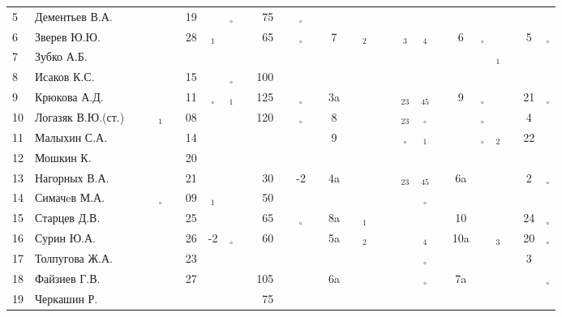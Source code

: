 \documentclass[a4paper,landscape,11pt]{article}
\newcommand*\OK{&\small \ding{51}$\!\!_\circ$} %
\newcommand*\Ok{&\small \ding{51}$\!\!_\circ$} %
\newcommand*\ok{&{\small\ding{51}}} %
\newcommand*\no{&{\small }} %
\newcommand*\da{&{\small\ding{48}$\!\!_1$}} %
\newcommand*\db{&{\small\ding{48}$\!\!_2$}} %
\newcommand*\bc{&{\small\ding{48}$\!\!_{23}$}} %
\newcommand*\dc{&{\small\ding{48}$\!\!_3$}} %
\newcommand*\dd{&{\small\ding{48}$\!\!_4$}} %
\newcommand*\De{&{\small\ding{48}$\!\!_{45}$}} %
\begin{document}
\begin{tabular}{l|l|ccccccccrccccccccccccccccc}
 5& Дементьев В.А.   \ok\ok\ok\ok&19\no\OK\ok& 75\no\Ok\ok \no\ok\no\no\ok\ok\no\no \no\ok\ok\ok\ok\no\\
 6& Зверев Ю.Ю.      \ok\ok\ok\ok&28\da\ok\ok& 65\ok\Ok\ok&  7\no\db\ok\ok\dc\dd\ok&  6\Ok\ok\ok& 5\Ok\\
 7& Зубко А.Б.       \ok\no\ok\ok\no\no\ok\ok \no\no\no\no \no\no\no\no\no\no\no\no \no\no\da\ok\no\no\\ 
 8& Исаков К.С.      \ok\ok\ok\ok&15\no\OK\ok&100\no\ok\ok \no\no\no\no\ok\no\no\no \no\no\no\no\no\no\\
 9& Крюкова А.Д.     \ok\ok\ok\ok&11\OK\da\ok&125\ok\Ok\ok& 3a\ok\ok\ok\ok\bc\De\ok&  9\Ok\no\no&21\Ok\\
10& Логазяк В.Ю.(ст.)\ok\ok\da\ok&08\no\ok\ok&120\ok\Ok\ok&  8\ok\ok\ok\ok\bc\Ok\ok \no\Ok\ok\ok& 4\no\\
\midrule
11& Малыхин С.А.     \ok\no\ok\ok&14\no\no\no \no\no\ok\ok&  9\no\no\no\ok\Ok\da\ok \no\Ok\db\ok&22\no\\
12& Мошкин К.        \ok\ok\ok\ok&20\ok\no\no \no\no\no\ok \no\no\no\no\no\no\no\no \no\no\no\no\no\no\\
13& Нагорных В.А.    \ok\ok\ok\ok&21\ok\ok\ok& 30\ok&-2\ok& 4a\ok\ok\ok\ok\bc\De\ok& 6a\no\ok\ok& 2\Ok\\
14& Симачeв М.А.     \ok\ok\OK\ok&09\da\no\no& 50\no\no\no \no\no\ok\ok\ok\no\Ok\ok \no\no\no\no\no\no\\
15& Старцев Д.В.     \ok\ok\ok\ok&25\ok\ok\ok& 65\ok\Ok\ok& 8a\ok\da\ok\ok\ok\ok\ok& 10\ok\ok\ok&24\Ok\\
16& Сурин Ю.А.       \ok\ok\ok\ok&26&-2\OK\ok& 60\ok\ok\ok& 5a\ok\db\ok\ok\no\dd\ok&10a\ok\dc\ok&20\Ok\\
17& Толпугова Ж.А.   \no\no\no\no&23\ok\no\no \no\no\no\no \no\no\ok\ok\no\ok\Ok\ok \no\no\no\no& 3\no\\
18& Файзиев Г.В.     \ok\ok\ok\ok&27\ok\ok\ok&105\ok\ok\ok& 6a\ok\no\ok\ok\ok\Ok\ok& 7a\ok\ok\ok\ok\Ok\\
19& Черкашин Р.      \ok\ok\ok\ok\no\no\no\no& 75\no\ok\ok \no\no\no\no\no\no\no\no \no\no\no\no\no\no\\ 
\bottomrule
\end{tabular} 
\end{document}
